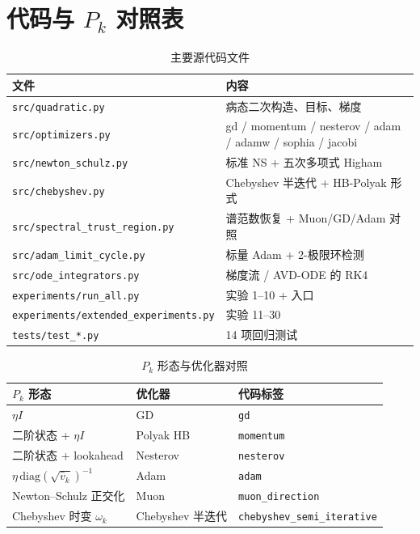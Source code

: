 \section{代码与 $P_k$ 对照表}
\label{app:code}

\begin{table}[htbp]
  \centering
  \caption{主要源代码文件}
  \small
  \begin{tabular}{@{}ll@{}}
    \toprule
    文件 & 内容 \\
    \midrule
    \texttt{src/quadratic.py} & 病态二次构造、目标、梯度 \\
    \texttt{src/optimizers.py} & gd / momentum / nesterov / adam / adamw / sophia / jacobi \\
    \texttt{src/newton\_schulz.py} & 标准 NS + 五次多项式 Higham \\
    \texttt{src/chebyshev.py} & Chebyshev 半迭代 + HB-Polyak 形式 \\
    \texttt{src/spectral\_trust\_region.py} & 谱范数恢复 + Muon/GD/Adam 对照 \\
    \texttt{src/adam\_limit\_cycle.py} & 标量 Adam + 2-极限环检测 \\
    \texttt{src/ode\_integrators.py} & 梯度流 / AVD-ODE 的 RK4 \\
    \texttt{experiments/run\_all.py} & 实验 1--10 + 入口 \\
    \texttt{experiments/extended\_experiments.py} & 实验 11--30 \\
    \texttt{tests/test\_*.py} & 14 项回归测试 \\
    \bottomrule
  \end{tabular}
\end{table}

\begin{table}[htbp]
  \centering
  \caption{$P_k$ 形态与优化器对照}
  \small
  \begin{tabular}{@{}lll@{}}
    \toprule
    $P_k$ 形态 & 优化器 & 代码标签 \\
    \midrule
    $\eta I$ & GD & \texttt{gd} \\
    二阶状态 + $\eta I$ & Polyak HB & \texttt{momentum} \\
    二阶状态 + lookahead & Nesterov & \texttt{nesterov} \\
    $\eta\,\mathrm{diag}(\sqrt{\hat v_k})^{-1}$ & Adam & \texttt{adam} \\
    Newton--Schulz 正交化 & Muon & \texttt{muon\_direction} \\
    Chebyshev 时变 $\omega_k$ & Chebyshev 半迭代 & \texttt{chebyshev\_semi\_iterative} \\
    \bottomrule
  \end{tabular}
\end{table}
